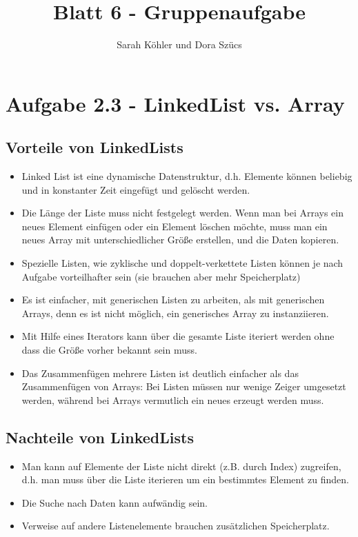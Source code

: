 \documentclass[12pt]{amsart}
\title{Blatt 6 - Gruppenaufgabe}
\author{Sarah Köhler und Dora Szücs}
\begin{document}
\maketitle

\section*{Aufgabe 2.3 - LinkedList vs. Array}
\subsection*{Vorteile von LinkedLists}

\begin{itemize}
\item Linked List ist eine dynamische Datenstruktur, d.h. Elemente können beliebig und in konstanter Zeit eingefügt und gelöscht werden. 

\item Die Länge der Liste muss nicht festgelegt werden. Wenn man bei Arrays ein neues Element einfügen oder ein Element löschen möchte, muss man ein neues Array mit unterschiedlicher Größe erstellen, und die Daten kopieren.

\item Spezielle Listen, wie zyklische und doppelt-verkettete Listen können je nach Aufgabe vorteilhafter sein (sie brauchen aber mehr Speicherplatz) 

\item Es ist einfacher, mit generischen Listen zu arbeiten, als mit generischen Arrays, denn es ist nicht möglich, ein generisches Array zu instanziieren. 
\item Mit Hilfe eines Iterators kann über die gesamte Liste iteriert werden ohne dass die Größe vorher bekannt sein muss. 
\item Das Zusammenfügen mehrere Listen ist deutlich einfacher als das Zusammenfügen von Arrays: Bei Listen müssen nur wenige Zeiger umgesetzt werden, während bei Arrays vermutlich ein neues erzeugt werden muss.
\end{itemize}

\subsection*{Nachteile von LinkedLists}
\begin{itemize}
\item Man kann auf Elemente der Liste nicht direkt (z.B. durch Index) zugreifen, d.h. man muss über die Liste iterieren um ein bestimmtes Element zu finden.

\item Die Suche nach Daten kann aufwändig sein.

\item Verweise auf andere Listenelemente brauchen zusätzlichen Speicherplatz.
\end{itemize}
\end{document}
